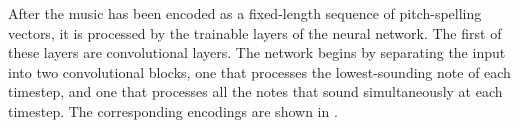 
After the music has been encoded as a fixed-length sequence
of pitch-spelling vectors, it is processed by the trainable
layers of the neural network. The first of these layers are
convolutional layers. The network begins by separating the
input into two convolutional blocks, one that processes the
lowest-sounding note of each timestep, and one that
processes all the notes that sound simultaneously at each
timestep. The corresponding encodings are shown in
.

